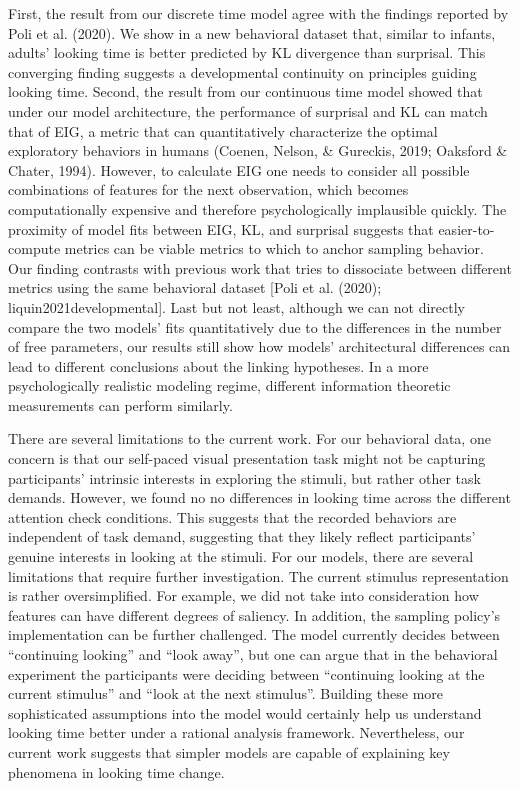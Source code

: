 \documentclass[10pt, letterpaper]{article}
\begin{document}
First, the result from our discrete time model agree with the findings
reported by Poli et al. (2020). We show in a new behavioral dataset
that, similar to infants, adults' looking time is better predicted by KL
divergence than surprisal. This converging finding suggests a
developmental continuity on principles guiding looking time. Second, the
result from our continuous time model showed that under our model
architecture, the performance of surprisal and KL can match that of EIG,
a metric that can quantitatively characterize the optimal exploratory
behaviors in humans (Coenen, Nelson, \& Gureckis, 2019; Oaksford \&
Chater, 1994). However, to calculate EIG one needs to consider all
possible combinations of features for the next observation, which
becomes computationally expensive and therefore psychologically
implausible quickly. The proximity of model fits between EIG, KL, and
surprisal suggests that easier-to-compute metrics can be viable metrics
to which to anchor sampling behavior. Our finding contrasts with
previous work that tries to dissociate between different metrics using
the same behavioral dataset {[}Poli et al. (2020);
liquin2021developmental{]}. Last but not least, although we can not
directly compare the two models' fits quantitatively due to the
differences in the number of free parameters, our results still show how
models' architectural differences can lead to different conclusions
about the linking hypotheses. In a more psychologically realistic
modeling regime, different information theoretic measurements can
perform similarly.

There are several limitations to the current work. For our behavioral
data, one concern is that our self-paced visual presentation task might
not be capturing participants' intrinsic interests in exploring the
stimuli, but rather other task demands. However, we found no no
differences in looking time across the different attention check
conditions. This suggests that the recorded behaviors are independent of
task demand, suggesting that they likely reflect participants' genuine
interests in looking at the stimuli. For our models, there are several
limitations that require further investigation. The current stimulus
representation is rather oversimplified. For example, we did not take
into consideration how features can have different degrees of saliency.
In addition, the sampling policy's implementation can be further
challenged. The model currently decides between ``continuing looking''
and ``look away'', but one can argue that in the behavioral experiment
the participants were deciding between ``continuing looking at the
current stimulus'' and ``look at the next stimulus''. Building these
more sophisticated assumptions into the model would certainly help us
understand looking time better under a rational analysis framework.
Nevertheless, our current work suggests that simpler models are capable
of explaining key phenomena in looking time change.
\end{document}
